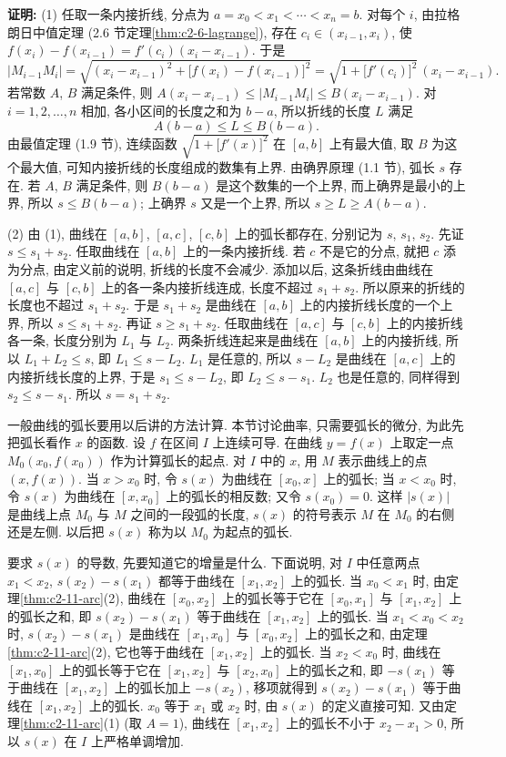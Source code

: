 \documentclass[UTF8,openany]{ctexbook}
\theoremstyle{chinesetextbook}
\newenvironment{cnproof}{\par\indent\textbf{证明:} \ignorespaces}{\par}
\begin{document}
\begin{cnproof}
(1) 任取一条内接折线, 分点为 $a=x_0<x_1<\cdots<x_n=b$. 对每个 $i$, 由拉格朗日中值定理 (2.6 节定理\ref{thm:c2-6-lagrange}), 存在 $c_i\in(x_{i-1},x_i)$, 使 $f(x_i)-f(x_{i-1})=f'(c_i)(x_i-x_{i-1})$. 于是
\[
|M_{i-1}M_i|=\sqrt{(x_i-x_{i-1})^2+\bigl[f(x_i)-f(x_{i-1})\bigr]^2}=\sqrt{1+\bigl[f'(c_i)\bigr]^2}\,(x_i-x_{i-1}).
\]
若常数 $A$, $B$ 满足条件, 则 $A(x_i-x_{i-1})\le|M_{i-1}M_i|\le B(x_i-x_{i-1})$. 对 $i=1,2,\ldots,n$ 相加, 各小区间的长度之和为 $b-a$, 所以折线的长度 $L$ 满足
\[
A(b-a)\le L\le B(b-a).
\]
由最值定理 (1.9 节), 连续函数 $\sqrt{1+\bigl[f'(x)\bigr]^2}$ 在 $[a,b]$ 上有最大值, 取 $B$ 为这个最大值, 可知内接折线的长度组成的数集有上界. 由确界原理 (1.1 节), 弧长 $s$ 存在. 若 $A$, $B$ 满足条件, 则 $B(b-a)$ 是这个数集的一个上界, 而上确界是最小的上界, 所以 $s\le B(b-a)$; 上确界 $s$ 又是一个上界, 所以 $s\ge L\ge A(b-a)$.

(2) 由 (1), 曲线在 $[a,b]$, $[a,c]$, $[c,b]$ 上的弧长都存在, 分别记为 $s$, $s_1$, $s_2$. 先证 $s\le s_1+s_2$. 任取曲线在 $[a,b]$ 上的一条内接折线. 若 $c$ 不是它的分点, 就把 $c$ 添为分点, 由定义前的说明, 折线的长度不会减少. 添加以后, 这条折线由曲线在 $[a,c]$ 与 $[c,b]$ 上的各一条内接折线连成, 长度不超过 $s_1+s_2$. 所以原来的折线的长度也不超过 $s_1+s_2$. 于是 $s_1+s_2$ 是曲线在 $[a,b]$ 上的内接折线长度的一个上界, 所以 $s\le s_1+s_2$. 再证 $s\ge s_1+s_2$. 任取曲线在 $[a,c]$ 与 $[c,b]$ 上的内接折线各一条, 长度分别为 $L_1$ 与 $L_2$. 两条折线连起来是曲线在 $[a,b]$ 上的内接折线, 所以 $L_1+L_2\le s$, 即 $L_1\le s-L_2$. $L_1$ 是任意的, 所以 $s-L_2$ 是曲线在 $[a,c]$ 上的内接折线长度的上界, 于是 $s_1\le s-L_2$, 即 $L_2\le s-s_1$. $L_2$ 也是任意的, 同样得到 $s_2\le s-s_1$. 所以 $s=s_1+s_2$.
\end{cnproof}
一般曲线的弧长要用以后讲的方法计算. 本节讨论曲率, 只需要弧长的微分, 为此先把弧长看作 $x$ 的函数. 设 $f$ 在区间 $I$ 上连续可导. 在曲线 $y=f(x)$ 上取定一点 $M_0(x_0,f(x_0))$ 作为计算弧长的起点. 对 $I$ 中的 $x$, 用 $M$ 表示曲线上的点 $(x,f(x))$. 当 $x>x_0$ 时, 令 $s(x)$ 为曲线在 $[x_0,x]$ 上的弧长; 当 $x<x_0$ 时, 令 $s(x)$ 为曲线在 $[x,x_0]$ 上的弧长的相反数; 又令 $s(x_0)=0$. 这样 $|s(x)|$ 是曲线上点 $M_0$ 与 $M$ 之间的一段弧的长度, $s(x)$ 的符号表示 $M$ 在 $M_0$ 的右侧还是左侧. 以后把 $s(x)$ 称为以 $M_0$ 为起点的弧长.

要求 $s(x)$ 的导数, 先要知道它的增量是什么. 下面说明, 对 $I$ 中任意两点 $x_1<x_2$, $s(x_2)-s(x_1)$ 都等于曲线在 $[x_1,x_2]$ 上的弧长. 当 $x_0<x_1$ 时, 由定理\ref{thm:c2-11-arc}(2), 曲线在 $[x_0,x_2]$ 上的弧长等于它在 $[x_0,x_1]$ 与 $[x_1,x_2]$ 上的弧长之和, 即 $s(x_2)-s(x_1)$ 等于曲线在 $[x_1,x_2]$ 上的弧长. 当 $x_1<x_0<x_2$ 时, $s(x_2)-s(x_1)$ 是曲线在 $[x_1,x_0]$ 与 $[x_0,x_2]$ 上的弧长之和, 由定理\ref{thm:c2-11-arc}(2), 它也等于曲线在 $[x_1,x_2]$ 上的弧长. 当 $x_2<x_0$ 时, 曲线在 $[x_1,x_0]$ 上的弧长等于它在 $[x_1,x_2]$ 与 $[x_2,x_0]$ 上的弧长之和, 即 $-s(x_1)$ 等于曲线在 $[x_1,x_2]$ 上的弧长加上 $-s(x_2)$, 移项就得到 $s(x_2)-s(x_1)$ 等于曲线在 $[x_1,x_2]$ 上的弧长. $x_0$ 等于 $x_1$ 或 $x_2$ 时, 由 $s(x)$ 的定义直接可知. 又由定理\ref{thm:c2-11-arc}(1) (取 $A=1$), 曲线在 $[x_1,x_2]$ 上的弧长不小于 $x_2-x_1>0$, 所以 $s(x)$ 在 $I$ 上严格单调增加.
\end{document}
